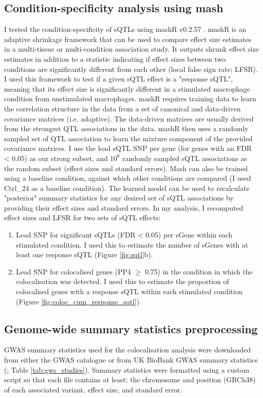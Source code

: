 \subsection{Condition-specificity analysis using mash}
I tested the condition-specificity of sQTLs using mashR v0.2.57 \cite{Urbut2019-gf}. mashR is an adaptive shrinkage framework that can be used to compare effect size estimates in a multi-tissue or multi-condition association study. It outputs shrunk effect size estimates in addition to a statistic indicating if effect sizes between two conditions are significantly different from each other (local false sign rate; LFSR). I used this framework to test if a given sQTL effect is a "response sQTL", meaning that its effect size is significantly different in a stimulated macrophage condition from unstimulated macrophages. mashR requires training data to learn the correlation structure in the data from a set of canonical and data-driven covariance matrices (i.e. adaptive). The data-driven matrices are usually derived from the strongest QTL associations in the data. mashR then uses a randomly sampled set of QTL association to learn the mixture component of the provided covariance matrices. I use the lead sQTL SNP per gene (for genes with an FDR < 0.05) as our strong subset, and $10^6$ randomly sampled sQTL associations as the random subset (effect sizes and standard errors). Mash can also be trained using a baseline condition, against which other conditions are compared (I used Ctrl\_24 as a baseline condition). The learned model can be used to recalculate "posterior" summary statistics for any desired set of sQTL associations by providing their effect sizes and standard errors. In my analysis, I recomputed effect sizes and LFSR for two sets of sQTL effects: 
\begin{enumerate}
\item Lead SNP for significant sQTLs (FDR < 0.05) per sGene within each stimulated condition. I used this to estimate the number of sGenes with at least one response sQTL (Figure \ref{fig:sqtl}b).
\item Lead SNP for colocalised genes (PP4 $\geq$ 0.75) in the condition in which the colocalisation was detected. I used this to estimate the proportion of colocalised genes with a response sQTL within each stimulated condition (Figure \ref{fig:coloc_cum_response_sqtl}). 
\end{enumerate}
\subsection{Genome-wide summary statistics preprocessing}
GWAS summary statistics used for the colocalisation analysis were downloaded from either the GWAS catalogue \cite{Buniello2019-wb} or from UK BioBank GWAS summary statistics (\cite{Zhou2018-jh}; Table \ref{tab:gws_studies}). Summary statistics were formatted using a custom script so that each file contains at least: the chromosome and position (GRCh38) of each associated variant, effect size, and standard error. 

